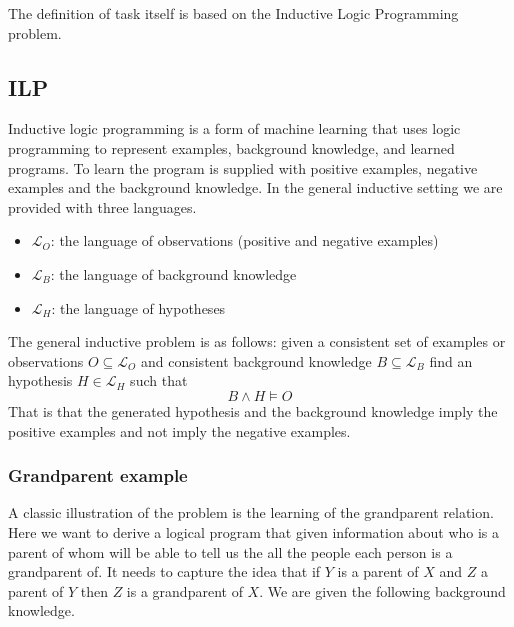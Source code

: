The definition of task itself is based on the Inductive Logic Programming problem.

\subsection{ILP}\label{sec:ILP}
Inductive logic programming is a form of machine learning that uses logic programming to represent examples, background knowledge, and learned programs\cite{Cropper/EfficientLearning}. To learn the program is supplied with positive examples, negative examples and the background knowledge. In the general inductive setting we are provided with three languages.
\begin{itemize}
\item $\mathcal{L}_O$: the language of observations (positive and negative examples)
\item $\mathcal{L}_B$: the language of background knowledge
\item $\mathcal{L}_H$: the language of hypotheses
\end{itemize}
The general inductive problem is as follows: given a consistent set of examples or observations $O \subseteq \mathcal{L}_O$ and consistent background knowledge $B \subseteq \mathcal{L}_B$ find an hypothesis $H \in \mathcal{L}_H$ such that \[B \wedge H \vDash O\] \cite{Muggleton/ILP}
That is that the generated hypothesis and the background knowledge imply the positive examples and not imply the negative examples.

\subsubsection{Grandparent example}
A classic illustration of the problem is the learning of the grandparent relation. Here we want to derive a logical program that given information about who is a parent of whom will be able to tell us the all the people each person is a grandparent of. It needs to capture the idea that if $Y$ is a parent of $X$ and $Z$ a parent of $Y$ then $Z$ is a grandparent of $X$. We are given the following background knowledge.

